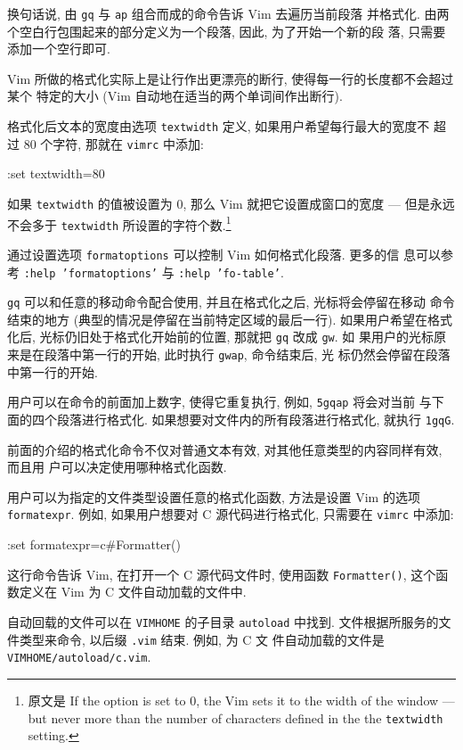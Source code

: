 换句话说, 由 \texttt{gq} 与 \texttt{ap} 组合而成的命令告诉 Vim 去遍历当前段落
并格式化. 由两个空白行包围起来的部分定义为一个段落, 因此, 为了开始一个新的段
落, 只需要添加一个空行即可.

Vim 所做的格式化实际上是让行作出更漂亮的断行, 使得每一行的长度都不会超过某个
特定的大小 (Vim 自动地在适当的两个单词间作出断行).

格式化后文本的宽度由选项 \texttt{textwidth} 定义, 如果用户希望每行最大的宽度不
超过 80 个字符, 那就在 \texttt{vimrc} 中添加:
\begin{vimcode}
:set textwidth=80
\end{vimcode}
如果 \texttt{textwidth} 的值被设置为 0, 那么 Vim 就把它设置成窗口的宽度 ---
但是永远不会多于 \texttt{textwidth} 所设置的字符个数.\footnote{ 原文是
If the option is set to 0, the Vim sets it to the width of the window ---
but never more than the number of characters defined in the the
\texttt{textwidth} setting.}

\begin{warning}
    通过设置选项 \texttt{formatoptions} 可以控制 Vim 如何格式化段落. 更多的信
    息可以参考 \texttt{:help 'formatoptions'} 与 \texttt{:help 'fo-table'}.
\end{warning}

\texttt{gq} 可以和任意的移动命令配合使用, 并且在格式化之后, 光标将会停留在移动
命令结束的地方 (典型的情况是停留在当前特定区域的最后一行). 如果用户希望在格式
化后, 光标仍旧处于格式化开始前的位置, 那就把 \texttt{gq} 改成 \texttt{gw}. 如
果用户的光标原来是在段落中第一行的开始, 此时执行 \texttt{gwap}, 命令结束后, 光
标仍然会停留在段落中第一行的开始.

用户可以在命令的前面加上数字, 使得它重复执行, 例如, \texttt{5gqap} 将会对当前
与下面的四个段落进行格式化. 如果想要对文件内的所有段落进行格式化, 就执行
\texttt{1gqG}.

前面的介绍的格式化命令不仅对普通文本有效, 对其他任意类型的内容同样有效, 而且用
户可以决定使用哪种格式化函数.

用户可以为指定的文件类型设置任意的格式化函数, 方法是设置 Vim 的选项
\texttt{formatexpr}. 例如, 如果用户想要对 C 源代码进行格式化, 只需要在
\texttt{vimrc} 中添加:
\begin{vimcode}
:set formatexpr=c#Formatter()
\end{vimcode}
这行命令告诉 Vim, 在打开一个 C 源代码文件时, 使用函数 \texttt{Formatter()},
这个函数定义在 Vim 为 C 文件自动加载的文件中.

\begin{warning}
    自动回载的文件可以在 \texttt{VIMHOME} 的子目录 \texttt{autoload} 中找到.
    文件根据所服务的文件类型来命令, 以后缀 \texttt{.vim} 结束. 例如, 为 C 文
    件自动加载的文件是 \texttt{VIMHOME/autoload/c.vim}.
\end{warning}

